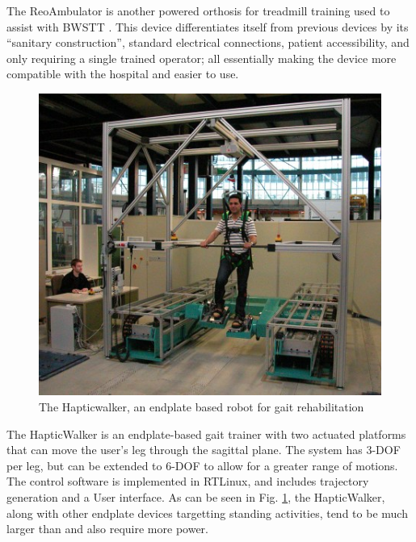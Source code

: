 \documentclass[12pt]{report}
\begin{document}
	The ReoAmbulator is another powered orthosis for treadmill training used to assist with BWSTT \cite{West2002}. This device differentiates itself from previous devices by its ``sanitary construction'', standard electrical connections, patient accessibility, and only requiring a single trained operator; all essentially making the device more compatible with the hospital and easier to use. 
	
	
	
	\begin{figure}[h] 
		\centering
		\includegraphics[width=0.7\linewidth]{Hapticwalker}
		\caption{The Hapticwalker, an endplate based robot for gait rehabilitation}
		\label{fig:Hapticwalker}
	\end{figure}
	
	The HapticWalker \cite{Schmidt2005} is an endplate-based gait trainer with two actuated platforms that can move the user's leg through the sagittal plane. The system has 3-DOF per leg, but can be extended to 6-DOF to allow for a greater range of motions. The control software is implemented in RTLinux, and includes trajectory generation and a User interface. As can be seen in Fig. \ref{fig:Hapticwalker}, the HapticWalker, along with other endplate devices targetting standing activities, tend to be much larger than and also require more power.
	
\end{document}
